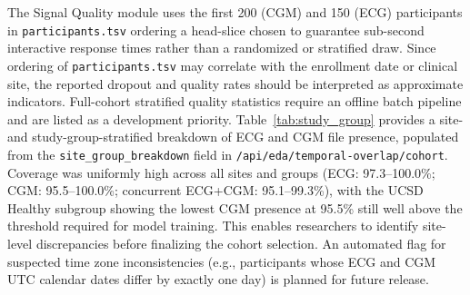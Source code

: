 \documentclass[conference]{IEEEtran}
\begin{document}
The Signal Quality module uses the first 200 (CGM) and 150 (ECG) participants in \texttt{participants.tsv} ordering a head-slice chosen to guarantee sub-second interactive response times rather than a randomized or stratified draw. Since ordering of \texttt{participants.tsv} may correlate with the enrollment date or clinical site, the reported dropout and quality rates should be interpreted as approximate indicators. Full-cohort stratified quality statistics require an offline batch pipeline and are listed as a development priority. Table~\ref{tab:study_group} provides a site- and study-group-stratified breakdown of ECG and CGM file presence, populated from the \texttt{site\_group\_breakdown} field in \texttt{/api/eda/temporal-overlap/cohort}. Coverage was uniformly high across all sites and groups (ECG: 97.3--100.0\%; CGM: 95.5--100.0\%; concurrent ECG+CGM: 95.1--99.3\%), with the UCSD Healthy subgroup showing the lowest CGM presence at 95.5\% still well above the threshold required for model training. This enables researchers to identify site-level discrepancies before finalizing the cohort selection. An automated flag for suspected time zone inconsistencies (e.g., participants whose ECG and CGM UTC calendar dates differ by exactly one day) is planned for future release.
\end{document}
